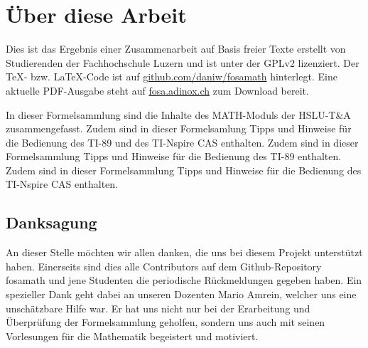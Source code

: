 



\chapter*{Über diese Arbeit}
Dies ist das Ergebnis einer Zusammenarbeit auf Basis freier Texte erstellt von Studierenden der Fachhochschule Luzern und ist unter der GPLv2 lizenziert. Der \TeX - bzw. \LaTeX -Code ist auf \url{github.com/daniw/fosamath} hinterlegt. Eine aktuelle PDF-Ausgabe steht auf \url{fosa.adinox.ch} zum Download bereit.

In dieser Formelsammlung sind die Inhalte des MATH-Moduls der HSLU-T\&A zusammengefasst.
%
\iftiboth
	Zudem sind in dieser Formelsamlung Tipps und Hinweise für die Bedienung des TI-89 und des TI-Nspire CAS enthalten. 
	\else
	\ifti
		Zudem sind in dieser Formelsammlung Tipps und Hinweise für die Bedienung des TI-89 enthalten. 
	\fi
	\ifnspire
		Zudem sind in dieser Formelsammlung Tipps und Hinweise für die Bedienung des TI-Nspire CAS enthalten. 
	\fi
\fi




\section*{Danksagung}
An dieser Stelle möchten wir allen danken, die uns bei diesem Projekt unterstützt haben.
Einerseits sind dies alle Contributors auf dem Github-Repository fosamath und jene Studenten die
periodische Rückmeldungen gegeben haben.
Ein spezieller Dank geht dabei an unseren Dozenten Mario Amrein, welcher uns eine unschätzbare Hilfe war.
Er hat uns nicht nur bei der Erarbeitung und Überprüfung der Formelsammlung geholfen, sondern uns auch 
mit seinen Vorlesungen für die Mathematik begeistert und motiviert.


